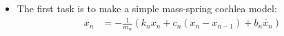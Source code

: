 

\begin{itemize}
\item The first task is to make a simple mass-spring cochlea model:
\begin{align*}
	\ddot{x_n} &= - \frac{1}{m_n} \left( k_n x_n + c_n (x_n-x_{n-1}) + b_n \dot{x_n} \right)
\end{align*}
\end{itemize}


